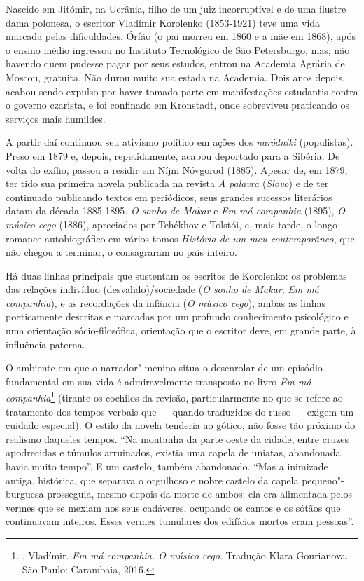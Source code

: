 Nascido em Jitómir, na Ucrânia, filho de um juiz incorruptível e
de uma ilustre dama polonesa, o escritor Vladímir Korolenko
(1853-1921) teve uma vida marcada pelas dificuldades. Órfão (o
pai morreu em 1860 e a mãe em 1868), após o ensino médio ingressou
no Instituto Tecnológico de São Petersburgo, mas, não havendo quem
pudesse pagar por seus estudos, entrou na Academia Agrária de Moscou,
gratuita. Não durou muito sua estada na Academia. Dois anos depois,
acabou sendo expulso por haver tomado parte em manifestações estudantis
contra o governo czarista, e foi confinado em Kronstadt, onde sobreviveu
praticando os serviços mais humildes.

A partir daí continuou seu ativismo político em ações dos
\emph{naródniki} (populistas). Preso em 1879 e, depois,
repetidamente, acabou deportado para a Sibéria. De volta do
exílio, passou a residir em Níjni Nóvgorod (1885). Apesar de,
em 1879, ter tido sua primeira novela publicada na revista
\emph{A palavra} (\emph{Slovo}) e de ter continuado publicando
textos em periódicos, seus grandes sucessos literários datam da
década 1885-1895. \emph{O sonho de Makar} e \emph{Em má companhia}
(1895), \emph{O músico cego} (1886), apreciados por Tchékhov e
Tolstói, e, mais tarde, o longo romance autobiográfico em vários
tomos \emph{História de um meu contemporâneo}, que não chegou a
terminar, o consagraram no país inteiro.

Há duas linhas principais que sustentam os escritos de Korolenko:
os problemas das relações indivíduo (desvalido)/sociedade (\emph{O
sonho de Makar}, \emph{Em má companhia}), e as recordações da
infância (\emph{O músico cego}), ambas as linhas poeticamente
descritas e marcadas por um profundo conhecimento psicológico e
uma orientação sócio-filosófica, orientação que o escritor deve,
em grande parte, à influência paterna.

O ambiente em que o narrador"-menino situa o desenrolar de um episódio
fundamental em sua vida é admiravelmente transposto no livro \emph{Em má
companhia}\footnote{, Vladímir. \emph{Em má companhia. O músico
  cego}. Tradução Klara Gourianova. São Paulo: Carambaia, 2016.} (tirante
os cochilos da revisão, particularmente no que se refere ao tratamento
dos tempos verbais que --- quando traduzidos do russo --- exigem um
cuidado especial). O estilo da novela tenderia ao gótico, não fosse tão
próximo do realismo daqueles tempos. ``Na montanha da parte oeste da
cidade, entre cruzes apodrecidas e túmulos arruinados, existia uma
capela de uniatas, abandonada havia muito tempo''. E um castelo, também
abandonado. ``Mas a inimizade antiga, histórica, que separava o
orgulhoso e nobre castelo da capela pequeno"-burguesa prosseguia,
mesmo depois da morte de ambos: ela era alimentada pelos vermes
que se mexiam nos seus cadáveres, ocupando os cantos e os sótãos
que continuavam inteiros. Esses vermes tumulares dos edifícios
mortos eram pessoas''.

